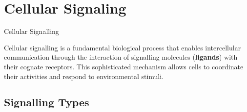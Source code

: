 \documentclass[10pt]{article}
\begin{document}
\section{Cellular Signaling}
  \label{sec:cellular_signaling}

  \begin{core}{Cellular Signalling}

    Cellular signalling is a fundamental biological process that enables intercellular communication through the interaction of signalling molecules (\textbf{ligands}) with their cognate receptors. This sophisticated mechanism allows cells to coordinate their activities and respond to environmental stimuli.

  \end{core}

  \subsection{Signalling Types}
\end{document}
